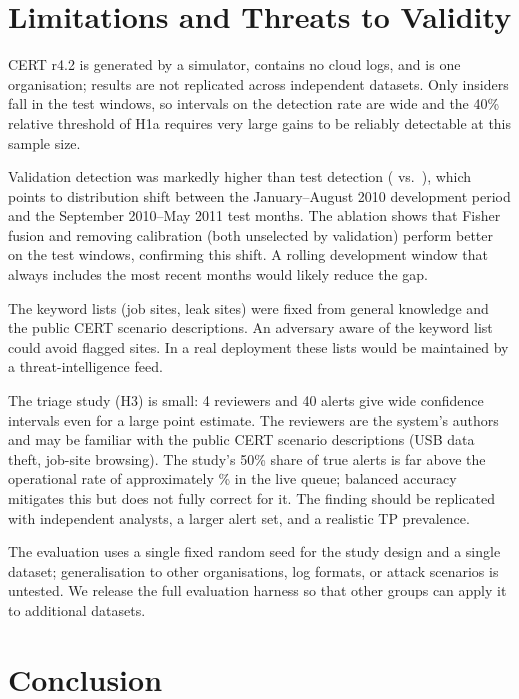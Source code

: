 \documentclass[conference]{IEEEtran}
\begin{document}
\section{Limitations and Threats to Validity}
CERT r4.2 is generated by a simulator, contains no cloud logs, and is one organisation; results
are not replicated across independent datasets. Only \NInsTest{} insiders fall in the test windows,
so intervals on the detection rate are wide and the 40\% relative threshold of H1a requires very
large gains to be reliably detectable at this sample size.

Validation detection was markedly higher than test detection (\ValDROurs{} vs.\ \DROursBA{}),
which points to distribution shift between the January--August 2010 development period and the
September 2010--May 2011 test months. The ablation shows that Fisher fusion and removing
calibration (both unselected by validation) perform better on the test windows, confirming this
shift. A rolling development window that always includes the most recent months would likely
reduce the gap.

The keyword lists (job sites, leak sites) were fixed from general knowledge and the public CERT
scenario descriptions. An adversary aware of the keyword list could avoid flagged sites.
In a real deployment these lists would be maintained by a threat-intelligence feed.

The triage study (H3) is small: 4 reviewers and 40 alerts give wide confidence intervals even for
a large point estimate. The reviewers are the system's authors and may be familiar with the
public CERT scenario descriptions (USB data theft, job-site browsing). The study's 50\% share
of true alerts is far above the operational rate of approximately \PosRate\% in the live queue;
balanced accuracy mitigates this but does not fully correct for it. The finding should be
replicated with independent analysts, a larger alert set, and a realistic TP prevalence.

The evaluation uses a single fixed random seed for the study design and a single dataset;
generalisation to other organisations, log formats, or attack scenarios is untested. We release
the full evaluation harness so that other groups can apply it to additional datasets.

\section{Conclusion}




\end{document}

